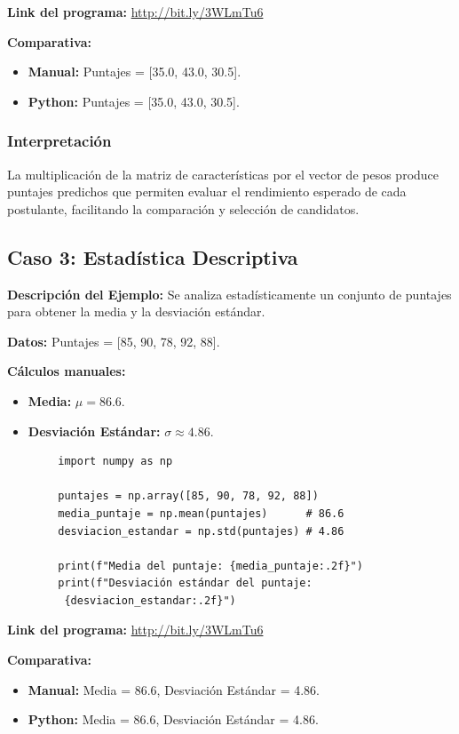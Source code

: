 \documentclass[12pt,a4,oneside]{book}
\begin{document}
	\textbf{Link del programa:} \url{http://bit.ly/3WLmTu6}
	
	\textbf{Comparativa:}
	\begin{itemize}
		\item \textbf{Manual:} Puntajes = [35.0, 43.0, 30.5].
		\item \textbf{Python:} Puntajes = [35.0, 43.0, 30.5].
	\end{itemize}
	
	\subsubsection{Interpretación}
	
	La multiplicación de la matriz de características por el vector de pesos produce puntajes predichos que permiten evaluar el rendimiento esperado de cada postulante, facilitando la comparación y selección de candidatos.
	
	\subsection{Caso 3: Estadística Descriptiva}
	
	\textbf{Descripción del Ejemplo:}  
	Se analiza estadísticamente un conjunto de puntajes para obtener la media y la desviación estándar.
	
	\textbf{Datos:} Puntajes = [85, 90, 78, 92, 88].
	
	\textbf{Cálculos manuales:}
	\begin{itemize}
		\item \textbf{Media:} \(\mu = 86.6\).
		\item \textbf{Desviación Estándar:} \(\sigma \approx 4.86\).
	\end{itemize}
	
	\begin{verbatim}
		import numpy as np
		
		puntajes = np.array([85, 90, 78, 92, 88])
		media_puntaje = np.mean(puntajes)      # 86.6
		desviacion_estandar = np.std(puntajes) # 4.86
		
		print(f"Media del puntaje: {media_puntaje:.2f}")
		print(f"Desviación estándar del puntaje:
		 {desviacion_estandar:.2f}")
	\end{verbatim}
	
	\textbf{Link del programa:} \url{http://bit.ly/3WLmTu6}
	
	\textbf{Comparativa:}
	\begin{itemize}
		\item \textbf{Manual:} Media = 86.6, Desviación Estándar = 4.86.
		\item \textbf{Python:} Media = 86.6, Desviación Estándar = 4.86.
	\end{itemize}
	
\end{document}
